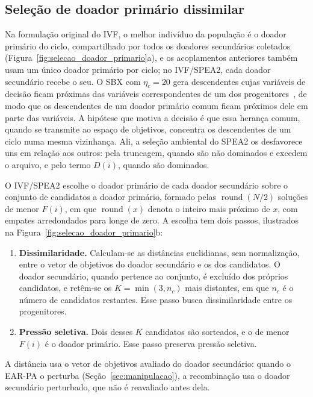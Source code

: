 \subsection{Seleção de doador primário dissimilar}
\label{sec:pai_dissimilar}

Na formulação original do IVF, o melhor indivíduo da população é o doador primário do ciclo, compartilhado por todos os doadores secundários coletados (Figura~\ref{fig:selecao_doador_primario}a), e os acoplamentos anteriores também usam um único doador primário por ciclo; no IVF/SPEA2, cada doador secundário recebe o seu. O SBX com $\eta_c = 20$ gera descendentes cujas variáveis de decisão ficam próximas das variáveis correspondentes de um dos progenitores~\cite{deb1995simulated}, de modo que os descendentes de um doador primário comum ficam próximos dele em parte das variáveis. A hipótese que motiva a decisão é que essa herança comum, quando se transmite ao espaço de objetivos, concentra os descendentes de um ciclo numa mesma vizinhança. Ali, a seleção ambiental do SPEA2 os desfavorece uns em relação aos outros: pela truncagem, quando são não dominados e excedem o arquivo, e pelo termo $D(i)$, quando são dominados.

O IVF/SPEA2 escolhe o doador primário de cada doador secundário sobre o conjunto de candidatos a doador primário, formado pelas $\operatorname{round}(N/2)$ soluções de menor $F(i)$, em que $\operatorname{round}(x)$ denota o inteiro mais próximo de $x$, com empates arredondados para longe de zero. A escolha tem dois passos, ilustrados na Figura~\ref{fig:selecao_doador_primario}b:
\begin{enumerate}
    \item \textbf{Dissimilaridade.} Calculam-se as distâncias euclidianas, sem normalização, entre o vetor de objetivos do doador secundário e os dos candidatos. O doador secundário, quando pertence ao conjunto, é excluído dos próprios candidatos, e retêm-se os $K = \min(3, n_c)$ mais distantes, em que $n_c$ é o número de candidatos restantes. Esse passo busca dissimilaridade entre os progenitores.
    \item \textbf{Pressão seletiva.} Dois desses $K$ candidatos são sorteados, e o de menor $F(i)$ é o doador primário. Esse passo preserva pressão seletiva.
\end{enumerate}
A distância usa o vetor de objetivos avaliado do doador secundário: quando o EAR-PA o perturba (Seção~\ref{sec:manipulacao}), a recombinação usa o doador secundário perturbado, que não é reavaliado antes dela.

